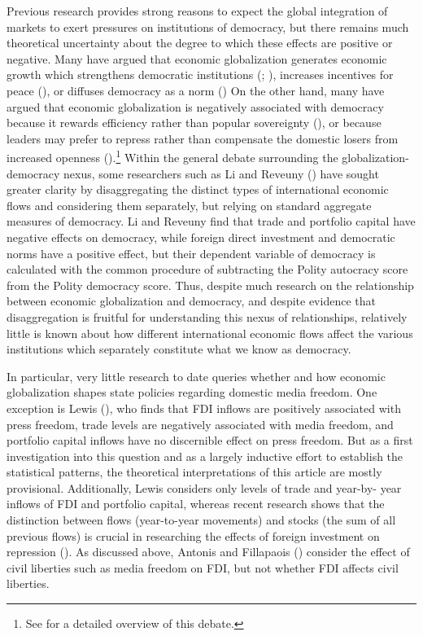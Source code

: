 \documentclass[12pt]{report}
\begin{document}
Previous research provides strong reasons to expect the global integration of markets to exert
pressures on institutions of democracy, but there remains much theoretical uncertainty about the
degree to which these effects are positive or negative. Many have argued that economic globalization
generates economic growth which strengthens democratic institutions (\citealt{Baghwati:1997vy};
\citealt{Im:1996cl}), increases incentives for peace (\citealt{Baghwati:1997vy,Oneal:1999fc}), or
diffuses democracy as a norm (\citealt{Kant:1983uf,Limongi:1996dr}) On the other hand, many have
argued that economic globalization is negatively associated with democracy because it rewards
efficiency rather than popular sovereignty
(\citealt{Huntington:1975vt,Lindblom:1977ue,Cammack:1998gf}), or because leaders may prefer to
repress rather than compensate the domestic losers from increased openness
(\citealt{Adsera:2002vt}).\footnote{See \citealt{Li:2003vj} for a detailed overview of this debate.%
} Within the general debate surrounding the globalization-democracy nexus, some researchers such as
Li and Reveuny (\citeyear{Li:2003vj}) have sought greater clarity by disaggregating the distinct
types of international economic flows and considering them separately, but relying on standard
aggregate measures of democracy. Li and Reveuny find that trade and portfolio capital have negative
effects on democracy, while foreign direct investment and democratic norms have a positive effect,
but their dependent variable of democracy is calculated with the common procedure of subtracting the
Polity autocracy score from the Polity democracy score. Thus, despite much research on the
relationship between economic globalization and democracy, and despite evidence that disaggregation
is fruitful for understanding this nexus of relationships, relatively little is known about how
different international economic flows affect the various institutions which separately constitute
what we know as democracy.

In particular, very little research to date queries whether and how economic globalization shapes
state policies regarding domestic media freedom. One exception is Lewis
(\citeyear{Anonymous:lbhrCJXF}), who finds that FDI inflows are positively associated with press
freedom, trade levels are negatively associated with media freedom, and portfolio capital inflows
have no discernible effect on press freedom. But as a first investigation into this question and as
a largely inductive effort to establish the statistical patterns, the theoretical interpretations of
this article are mostly provisional. Additionally, Lewis considers only levels of trade and year-by-
year inflows of FDI and portfolio capital, whereas recent research shows that the distinction
between flows (year-to-year movements) and stocks (the sum of all previous flows) is crucial in
researching the effects of foreign investment on repression (\citeyear{Sorens:2012hc}). As discussed
above, Antonis and Fillapaois (\citeyear{Adam:2007gn}) consider the effect of civil liberties such
as media freedom on FDI, but not whether FDI affects civil liberties.
\end{document}
